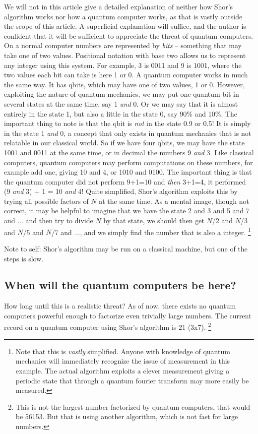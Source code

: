 \documentclass[conference]{IEEEtran}
\begin{document}
We will not in this article give a detailed explanation of neither how Shor's algorithm works nor how a quantum computer works, as that is vastly outside the scope of this article.
A superficial explanation will suffice, and the author is confident that it will be sufficient to appreciate the threat of quantum computers.
On a normal computer numbers are represented by \emph{bits} -- something that may take one of two values.
Positional notation with base two allows us to represent any integer using this system.
For example, 3 is 0011 and 9 is 1001, where the two values each bit can take is here 1 or 0.
A quantum computer works in much the same way.
It has qbits, which may have one of two values, 1 or 0.
However, exploiting the nature of quantum mechanics, we may put one quantum bit in several states at the same time, say 1 \emph{and} 0.
Or we may say that it is almost entirely in the state 1, but also a little in the state 0, say 90\% and 10\%.
The important thing to note is that the qbit is \emph{not} in the state 0.9 or 0.5!
It is simply in the state 1 \emph{and} 0, a concept that only exists in quantum mechanics that is not relatable in our classical world.
So if we have four qbits, we may have the state 1001 and 0011 at the same time, or in decimal the numbers 9 \emph{and} 3.
Like classical computers, quantum computers may perform computations on these numbers, for example add one, giving 10 and 4, or 1010 and 0100.
The important thing is that the quantum computer did not perform 9+1=10 and \emph{then} 3+1=4, it performed (9 \emph{and} 3) + 1 = 10 \emph{and} 4!
Quite simplified, Shor's algorithm exploits this by trying all possible factors of $N$ at the same time.
As a mental image, though not correct, it may be helpful to imagine that we have the state 2 and 3 and 5 and 7 and ... and then try to divide $N$ by that state, we should then get $N$/2 and $N$/3 and $N$/5 and $N$/7 and ..., and we simply find the number that is also a integer. \footnote{Note that this is \emph{vastly} simplified. Anyone with knowledge of quantum mechanics will immediately recognize the issue of measurement in this example. The actual algorithm exploits a clever measurement giving a periodic state that through a quantum fourier transform may more easily be measured.}

Note to self:
Shor's algorithm may be run on a classical machine, but one of the steps is slow.


\subsection{When will the quantum computers be here?}
How long until this is a realistic threat?
As of now, there exists no quantum computers powerful enough to factorize even trivially large numbers.
The current record on a quantum computer using Shor's algorithm is 21 (3x7). \footnote{This is not the largest number factorized by quantum computers, that would be 56153. But that is using another algorithm, which is not fast for large numbers.}
\end{document}
